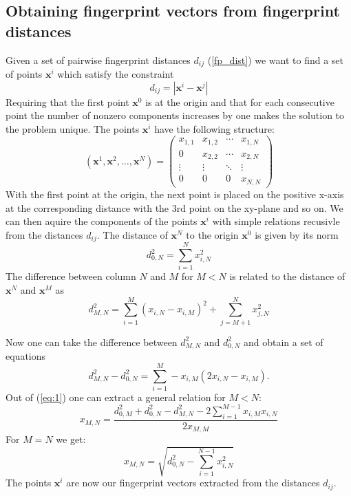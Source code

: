 \subsection{Obtaining fingerprint vectors from fingerprint distances}
Given a set of pairwise fingerprint distances $d_{ij}$ (\ref{fp_dist}) we want to find a set of points $\mathbf{x}^i$ which satisfy the constraint
\begin{equation}d_{ij}=|\mathbf{x}^i-\mathbf{x}^j|\end{equation}
Requiring that the first point $\mathbf{x}^0$ is at the origin and that for each consecutive point the number of nonzero components increases by one makes the solution to the problem unique. The points $\mathbf{x}^i$ have the following structure:
\begin{equation} (\mathbf{x}^1, \mathbf{x}^2, \ldots, \mathbf{x}^N) = 
\left(\begin{matrix}
x_{1,1} & x_{1,2} & \cdots & x_{1,N} \\
0 & x_{2,2} &\cdots & x_{2,N} \\
\vdots & \vdots & \ddots & \vdots \\
0 & 0 & 0 & x_{N,N}   
\end{matrix}\right)
\end{equation}
With the first point at the origin, the next point is placed on the positive x-axis at the corresponding distance with the 3rd point on the xy-plane and so on. We can then aquire the components of the points $\mathbf{x}^i$ with simple relations recusivle from the distances $d_{ij}$. The distance of $\mathbf{x}^N$ to the origin $\mathbf{x}^0$ is given by its norm
\begin{equation}d_{0,N}^2=\sum_{i=1}^N x_{i,N}^2\end{equation}
The difference between column $N$ and $M$ for $M<N$ is related to the distance of $\mathbf{x}^N$ and $\mathbf{x}^M$ as
\begin{equation}\label{eq:1}
 d^2_{M,N}=\sum_{i=1}^M(x_{i,N}-x_{i,M})^2+\sum_{j=M+1}^N x^2_{j,N}\end{equation}

Now one can take the difference between $d^2_{M,N}$ and $d^2_{0,N}$ and obtain a set of equations
\begin{equation}d^2_{M,N}-d^2_{0,N}=\sum_{i=1}^M -x_{i,M}(2x_{i,N} - x_{i,M}).\end{equation}
Out of (\ref{eq:1}) one can extract a general relation for $M<N$:
\begin{equation}
x_{M,N}=\frac{d^2_{0,M}+d^2_{0,N}-d^2_{M,N}-2\sum_{i=1}^{M-1} x_{i,M} x_{i,N} } {2x_{M,M}}
\end{equation}
For $M=N$ we get:
\begin{equation}
x_{M,N}=\sqrt{d^2_{0,N}-\sum_{i=1}^{N-1}x^2_{i,N}}
\end{equation}
The points $\mathbf{x}^i$ are now our fingerprint vectors extracted from the distances $d_{ij}$. 
